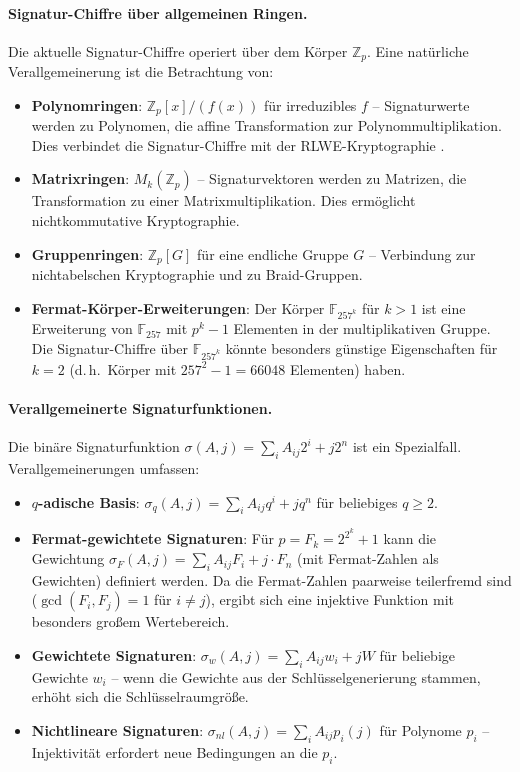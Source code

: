 ﻿\documentclass[a4paper,12pt]{scrreprt}
\theoremstyle{definition}
\begin{document}
\paragraph{Signatur-Chiffre über allgemeinen Ringen.}
Die aktuelle Signatur-Chiffre operiert über dem Körper $\mathbb{Z}_p$. Eine natürliche Verallgemeinerung ist die Betrachtung von:
\begin{itemize}
    \item \textbf{Polynomringen}: $\mathbb{Z}_p[x]/(f(x))$ für irreduzibles $f$ -- Signaturwerte werden zu Polynomen, die affine Transformation zur Polynommultiplikation. Dies verbindet die Signatur-Chiffre mit der RLWE-Kryptographie \cite{LPR10}.
    \item \textbf{Matrixringen}: $M_k(\mathbb{Z}_p)$ -- Signaturvektoren werden zu Matrizen, die Transformation zu einer Matrixmultiplikation. Dies ermöglicht nichtkommutative Kryptographie.
    \item \textbf{Gruppenringen}: $\mathbb{Z}_p[G]$ für eine endliche Gruppe $G$ -- Verbindung zur nichtabelschen Kryptographie und zu Braid-Gruppen.
    \item \textbf{Fermat-Körper-Erweiterungen}: Der Körper $\mathbb{F}_{257^k}$ für $k > 1$ ist eine Erweiterung von $\mathbb{F}_{257}$ mit $p^k - 1$ Elementen in der multiplikativen Gruppe. Die Signatur-Chiffre über $\mathbb{F}_{257^k}$ könnte besonders günstige Eigenschaften für $k = 2$ (d.\,h.\ Körper mit $257^2 - 1 = 66048$ Elementen) haben.
\end{itemize}

\paragraph{Verallgemeinerte Signaturfunktionen.}
Die binäre Signaturfunktion $\sigma(A,j) = \sum_i A_{ij} 2^i + j2^n$ ist ein Spezialfall. Verallgemeinerungen umfassen:
\begin{itemize}
    \item \textbf{$q$-adische Basis}: $\sigma_q(A,j) = \sum_i A_{ij} q^i + jq^n$ für beliebiges $q \geq 2$.
    \item \textbf{Fermat-gewichtete Signaturen}: Für $p = F_k = 2^{2^k}+1$ kann die Gewichtung $\sigma_{F}(A,j) = \sum_i A_{ij} F_i + j \cdot F_n$ (mit Fermat-Zahlen als Gewichten) definiert werden. Da die Fermat-Zahlen paarweise teilerfremd sind ($\gcd(F_i, F_j) = 1$ für $i \neq j$), ergibt sich eine injektive Funktion mit besonders großem Wertebereich.
    \item \textbf{Gewichtete Signaturen}: $\sigma_w(A,j) = \sum_i A_{ij} w_i + jW$ für beliebige Gewichte $w_i$ -- wenn die Gewichte aus der Schlüsselgenerierung stammen, erhöht sich die Schlüsselraumgröße.
    \item \textbf{Nichtlineare Signaturen}: $\sigma_{nl}(A,j) = \sum_i A_{ij} p_i(j)$ für Polynome $p_i$ -- Injektivität erfordert neue Bedingungen an die $p_i$.
\end{itemize}
\end{document}
